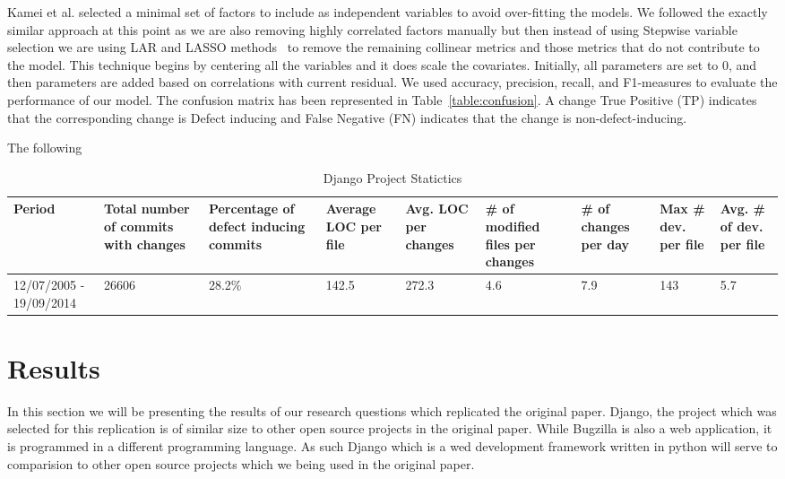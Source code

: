 \documentclass[10pt, conference]{IEEEtran}
\begin{document}
Kamei et al. selected a minimal set of factors to include as independent variables to avoid over-fitting the models. We followed the exactly similar approach at this point as we are also removing highly correlated factors manually but then instead of using Stepwise variable selection we are using LAR and LASSO methods~\cite{Flom2007NESUG} to remove the remaining collinear metrics and those metrics that do not contribute to the model. This technique begins by centering all the variables and it does scale the covariates. Initially, all parameters are set to 0, and then parameters are added based on correlations with current residual. 
We used accuracy, precision, recall, and F1-measures to evaluate the performance of our model. The confusion matrix has been represented in Table~\ref{table:confusion}. A change True Positive (TP) indicates that the corresponding change is Defect inducing and False Negative (FN) indicates that the change is non-defect-inducing.







The following 

\begin{table*}[t]
	\caption{Django Project Statictics}
	\begin{tabular}{|p{2 cm}|p{1.5 cm}|p{1.5 cm}|p{1.5 cm}|p{1.5 cm}|p{1.5 cm}|p{1.5 cm}|p{1.5 cm}|p{1.5 cm}|}
		\hline 
		Period  & Total number of commits with changes  & Percentage of defect inducing commits  & Average LOC per file  & Avg. LOC per changes  & \# of modified files per changes  & \# of changes per day  & Max \# dev. per file  & Avg. \# of dev. per file \tabularnewline
		\hline 
		12/07/2005 - 19/09/2014  & 26606  & 28.2\% & 142.5 & 272.3 & 4.6 & 7.9 & 143 & 5.7 \\ \hline 
	\end{tabular}
	\label{table:statistics}	
\end{table*}


\section{Results}
\label{sec:results}

In this section we will be presenting the results of our research questions which replicated the original paper. Django, the project which was selected for this replication is of similar size to other open source projects in the original paper. While Bugzilla is also a web application, it is programmed in a different programming language. As such Django which is a wed development framework written in python will serve to comparision to other open source projects which we being used in the original paper.
\end{document}
